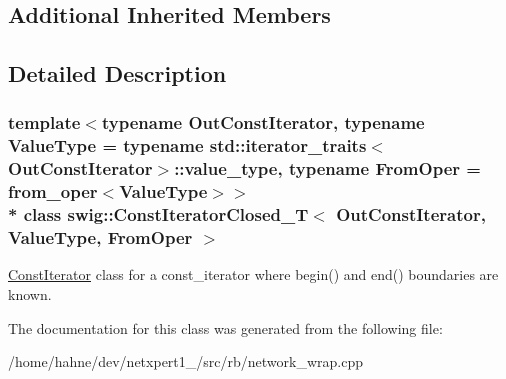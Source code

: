\subsection*{Additional Inherited Members}


\subsection{Detailed Description}
\subsubsection*{template$<$typename Out\+Const\+Iterator, typename Value\+Type = typename std\+::iterator\+\_\+traits$<$\+Out\+Const\+Iterator$>$\+::value\+\_\+type, typename From\+Oper = from\+\_\+oper$<$\+Value\+Type$>$$>$\\*
class swig\+::\+Const\+Iterator\+Closed\+\_\+\+T$<$ Out\+Const\+Iterator, Value\+Type, From\+Oper $>$}

\hyperlink{structswig_1_1ConstIterator}{Const\+Iterator} class for a const\+\_\+iterator where begin() and end() boundaries are known. 

The documentation for this class was generated from the following file\+:\begin{DoxyCompactItemize}
\item 
/home/hahne/dev/netxpert1\+\_/src/rb/network\+\_\+wrap.\+cpp\end{DoxyCompactItemize}

